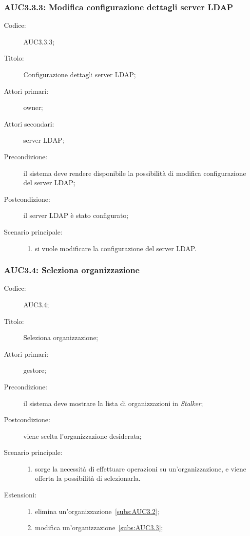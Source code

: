 \documentclass[../../../analisi-dei-requisiti.tex]{subfiles}
\begin{document}
\subsubsection{AUC3.3.3: Modifica configurazione dettagli server LDAP}%
\label{subs:AUC3.3.3}
\begin{description}
  \item[Codice:] AUC3.3.3;
  \item[Titolo:] Configurazione dettagli server LDAP\@;
  \item[Attori primari:] owner;
  \item[Attori secondari:] server LDAP\@;
  \item[Precondizione:] il sistema deve rendere disponibile la possibilità di modifica configurazione del server LDAP\@;
  \item[Postcondizione:] il server LDAP è stato configurato;
  \item[Scenario principale:]
        \begin{enumerate}
          \item si vuole modificare la configurazione del server LDAP\@.
        \end{enumerate}
\end{description}

\subsubsection{AUC3.4: Seleziona organizzazione}%
\label{subs:AUC3.4}
\begin{description}
  \item[Codice:] AUC3.4;
  \item[Titolo:] Seleziona organizzazione;
  \item[Attori primari:] gestore;
  \item[Precondizione:] il sistema deve mostrare la lista di organizzazioni in \emph{Stalker};
  \item[Postcondizione:] viene scelta l'organizzazione desiderata;
  \item[Scenario principale:]
        \begin{enumerate}
          \item sorge la necessità di effettuare operazioni su un'organizzazione, e viene offerta la possibilità di selezionarla.
        \end{enumerate}
  \item[Estensioni:]
        \begin{enumerate}
          \item elimina un'organizzazione~\ref{subs:AUC3.2};
          \item modifica un'organizzazione~\ref{subs:AUC3.3};
        \end{enumerate}
\end{description}
\end{document}
